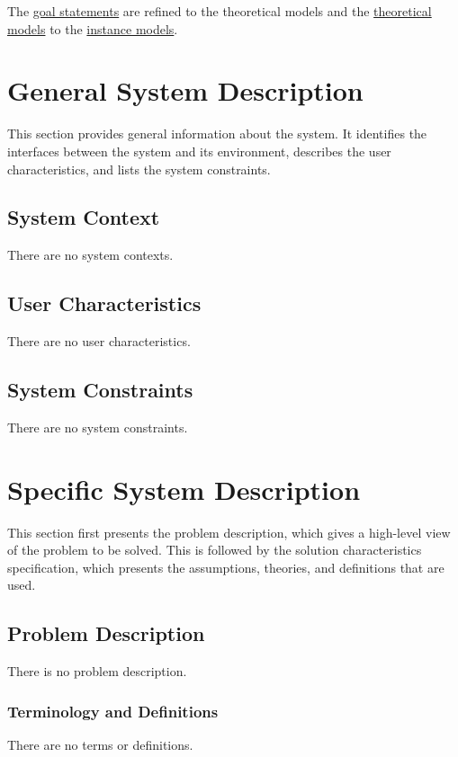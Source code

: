 \documentclass[12pt]{article}
\begin{document}
The \hyperref[Sec:GoalStmt]{goal statements} are refined to the theoretical models and the \hyperref[Sec:TMs]{theoretical models} to the \hyperref[Sec:IMs]{instance models}.

\section{General System Description}
\label{Sec:GenSysDesc}
This section provides general information about the system. It identifies the interfaces between the system and its environment, describes the user characteristics, and lists the system constraints.

\subsection{System Context}
\label{Sec:SysContext}
There are no system contexts.

\subsection{User Characteristics}
\label{Sec:UserChars}
There are no user characteristics.

\subsection{System Constraints}
\label{Sec:SysConstraints}
There are no system constraints.

\section{Specific System Description}
\label{Sec:SpecSystDesc}
This section first presents the problem description, which gives a high-level view of the problem to be solved. This is followed by the solution characteristics specification, which presents the assumptions, theories, and definitions that are used.

\subsection{Problem Description}
\label{Sec:ProbDesc}
There is no problem description.

\subsubsection{Terminology and Definitions}
\label{Sec:TermDefs}
There are no terms or definitions.
\end{document}
